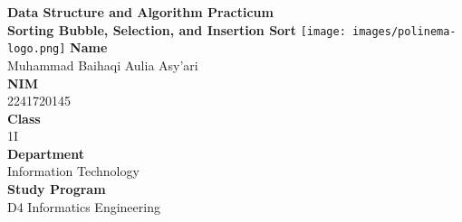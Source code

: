 \documentclass[12pt,titlepage]{article}
\newcommand{\vSubject}{Data Structure and Algorithm Practicum}
\newcommand{\vSubtitle}{Sorting}
\newcommand{\vSubsubtitle}{Bubble, Selection, and Insertion Sort}
\newcommand{\vName}{Muhammad Baihaqi Aulia Asy'ari}
\newcommand{\vNIM}{2241720145}
\newcommand{\vClass}{1I}
\newcommand{\vDepartment}{Information Technology}
\newcommand{\vStudyProgram}{D4 Informatics Engineering}
\begin{document}
\begin{titlepage}
    \centering
    \vfill
    {\bfseries\LARGE
        \vSubject\\
        \vskip0.25cm
        \vSubtitle
        \vskip0.25cm
        \vSubsubtitle
    }
    \vfill
    \texttt{[image: images/polinema-logo.png]}
    \vfill
    {
        \textbf{Name}\\
        \vName\\
        \vskip0.5cm
        \textbf{NIM}\\
        \vNIM\\
        \vskip0.5cm
        \textbf{Class}\\
        \vClass\\
        \vskip0.5cm
        \textbf{Department}\\
        \vDepartment\\
        \vskip0.5cm
        \textbf{Study Program}\\
        \vStudyProgram
    }
\end{titlepage}

\newpage

\setcounter{section}{2}
\end{document}
